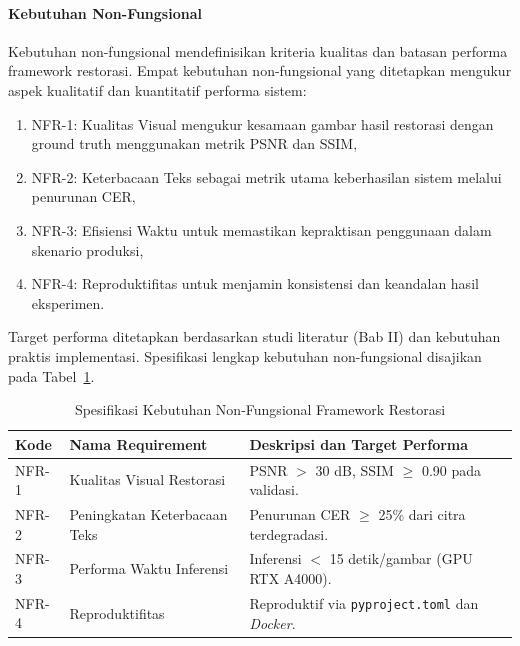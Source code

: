 \documentclass[12pt,a4paper]{article}
\begin{document}
\paragraph{Kebutuhan Non-Fungsional}

Kebutuhan non-fungsional mendefinisikan kriteria kualitas dan batasan performa framework restorasi. Empat kebutuhan non-fungsional yang ditetapkan mengukur aspek kualitatif dan kuantitatif performa sistem:

\begin{enumerate}[nosep]
    \item NFR-1: Kualitas Visual mengukur kesamaan gambar hasil restorasi dengan ground truth menggunakan metrik PSNR dan SSIM,
    \item NFR-2: Keterbacaan Teks sebagai metrik utama keberhasilan sistem melalui penurunan CER,
    \item NFR-3: Efisiensi Waktu untuk memastikan kepraktisan penggunaan dalam skenario produksi,
    \item NFR-4: Reproduktifitas untuk menjamin konsistensi dan keandalan hasil eksperimen.
\end{enumerate}

Target performa ditetapkan berdasarkan studi literatur (Bab II) dan kebutuhan praktis implementasi. Spesifikasi lengkap kebutuhan non-fungsional disajikan pada Tabel~\ref{tab:non_functional_requirements}.

\begin{table}[htbp!]
\centering
\small
\caption{Spesifikasi Kebutuhan Non-Fungsional Framework Restorasi}
\label{tab:non_functional_requirements}
\begin{tabular}{p{}p{}p{}}
\toprule
\textbf{Kode} & \textbf{Nama Requirement} & \textbf{Deskripsi dan Target Performa} \\
\midrule
NFR-1 & Kualitas Visual Restorasi & PSNR $>$ 30 dB, SSIM $\geq$ 0.90 pada validasi. \\
\midrule
NFR-2 & Peningkatan Keterbacaan Teks & Penurunan CER $\geq$ 25\% dari citra terdegradasi. \\
\midrule
NFR-3 & Performa Waktu Inferensi & Inferensi $<$ 15 detik/gambar (GPU RTX A4000). \\
\midrule
NFR-4 & Reproduktifitas & Reproduktif via \texttt{pyproject.toml} dan \textit{Docker}. \\
\bottomrule
\end{tabular}
\end{table}
\end{document}
